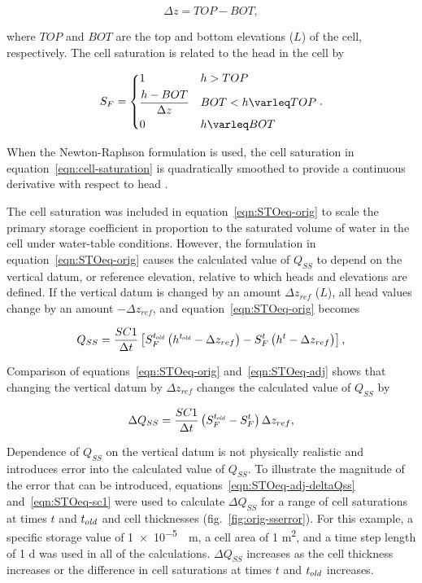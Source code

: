 \begin{equation}
	\label{eqn:cell-thickness}
	\Delta z = TOP - BOT,
\end{equation}
 
\noindent where $TOP$ and $BOT$ are the top and bottom elevations ($L$) of the cell, respectively. The cell saturation is related to the head in the cell by

\begin{align}
	\label{eqn:cell-saturation}
	S_{F} = \begin{dcases}
		1 & h > TOP \\
		\frac{h - BOT}{\Delta z} & BOT < h \le TOP \\
		0 & h \le BOT
	\end{dcases} .
\end{align}

\noindent When the Newton-Raphson formulation is used, the cell saturation in equation~\ref{eqn:cell-saturation} is quadratically smoothed to provide a continuous derivative with respect to head \citep[see][Fig.~4--1 and Eq.~4-5]{modflow6gwf}.

The cell saturation was included in equation~\ref{eqn:STOeq-orig} to scale the primary storage coefficient in proportion to the saturated volume of water in the cell under water-table conditions. However, the formulation in equation~\ref{eqn:STOeq-orig} causes the calculated value of $Q_{SS}$ to depend on the vertical datum, or reference elevation, relative to which heads and elevations are defined. If the vertical datum is changed by an amount $\Delta z_{ref}$ ($L$), all head values change by an amount $-\Delta z_{ref}$, and equation~\ref{eqn:STOeq-orig} becomes

\begin{equation}
	\label{eqn:STOeq-adj}
	Q_{SS} = \frac{SC1}{\Delta t} \left[ S_F^{t_\mathit{\kern -0.07em old}} \left(h^{t_\mathit{\kern -0.07em old}} -\Delta z_{ref} \right) - S_F^t \left( h^{t} -\Delta z_{ref} \right) \right] ,
\end{equation}

 \noindent Comparison of equations~\ref{eqn:STOeq-orig} and~\ref{eqn:STOeq-adj} shows that changing the vertical datum by $\Delta z_{ref}$ changes the calculated value of $Q_{SS}$ by

\begin{equation}
	\label{eqn:STOeq-adj-deltaQss}
	\Delta Q_{SS} = \frac{SC1}{\Delta t} \left( S_F^{t_\mathit{\kern -0.07em old}} - S_F^t \right)  \Delta z_{ref} ,
\end{equation}

\noindent Dependence of $Q_{SS}$ on the vertical datum is not physically realistic and introduces error into the calculated value of $Q_{SS}$.
To illustrate the magnitude of the error that can be introduced, equations~\ref{eqn:STOeq-adj-deltaQss} and~\ref{eqn:STOeq-sc1} were used to calculate $\Delta Q_{SS}$ for a range of cell saturations at times $t$ and ${t_\mathit{\kern -0.07em old}}$ and cell thicknesses (fig.~\ref{fig:orig-sserror}). For this example, a specific storage value of \SI{1e-5}{\per\meter}, a cell area of 1 \si{\square\meter}, and a time step length of 1 \si{\day} was used in all of the calculations. $\Delta Q_{SS}$ increases as the cell thickness increases or the difference in cell saturations at times $t$ and ${t_\mathit{\kern -0.07em old}}$ increases.

